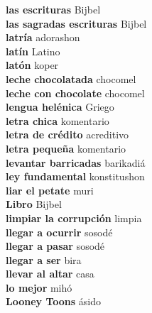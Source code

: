 \textbf{ las escrituras  } Bijbel \\
\textbf{ las sagradas escrituras  } Bijbel \\
\textbf{ latría  } adorashon \\
\textbf{ latín  } Latino \\
\textbf{ latón  } koper \\
\textbf{ leche chocolatada  } chocomel \\
\textbf{ leche con chocolate  } chocomel \\
\textbf{ lengua helénica  } Griego \\
\textbf{ letra chica  } komentario \\
\textbf{ letra de crédito  } acreditivo \\
\textbf{ letra pequeña  } komentario \\
\textbf{ levantar barricadas  } barikadiá \\
\textbf{ ley fundamental  } konstitushon \\
\textbf{ liar el petate  } muri \\
\textbf{ Libro  } Bijbel \\
\textbf{ limpiar la corrupción  } limpia \\
\textbf{ llegar a ocurrir  } sosodé \\
\textbf{ llegar a pasar  } sosodé \\
\textbf{ llegar a ser  } bira \\
\textbf{ llevar al altar  } casa \\
\textbf{ lo mejor  } mihó \\
\textbf{ Looney Toons  } ásido \\
